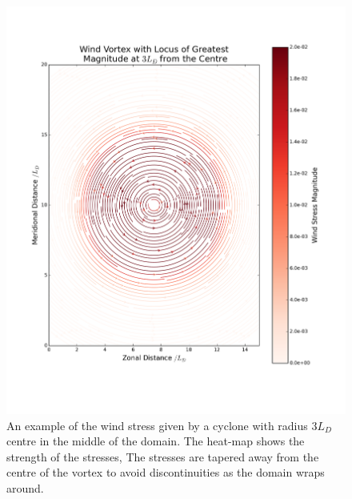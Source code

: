 \documentclass[12pt,a4paper]{report}
\begin{document}
\begin{figure}[t]
	\centering
	\begin{minipage}{0.65\linewidth}
		\includegraphics[width=\linewidth]{WindStressEg}
	\end{minipage}
	\quad
	\begin{minipage}{0.25\linewidth}
		\caption{An example of the wind stress given by a cyclone with
			radius $3 L_{D}$ centre in the middle of the domain. 
			The heat-map shows the strength of the stresses, 
			The  stresses are tapered away from the centre of the vortex to
			avoid discontinuities as the domain wraps around. }
		\label{fig:WindEg}
	\end{minipage}
\end{figure}
\end{document}
